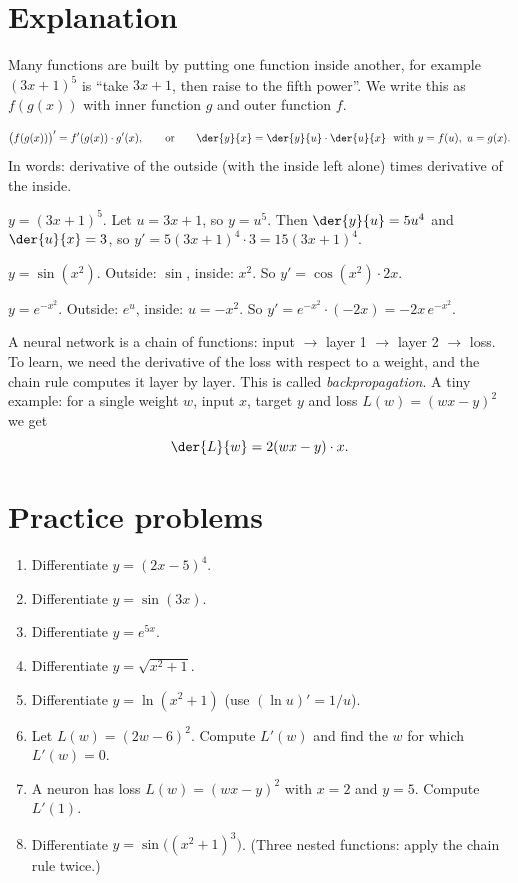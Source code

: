 \label{ch:chain}

\section*{Explanation}
Many functions are built by putting one function inside another, for example $(3x+1)^5$ is ``take $3x+1$, then raise to the fifth power''. We write this as $f(g(x))$ with inner function $g$ and outer function $f$.

\begin{keyidea}
\[
\bigl(f(g(x))\bigr)'=f'(g(x))\cdot g'(x),
\qquad\text{or}\qquad
\der{y}{x}=\der{y}{u}\cdot\der{u}{x}\ \ \text{with } y=f(u),\ u=g(x).
\]
In words: derivative of the outside (with the inside left alone) times derivative of the inside.
\end{keyidea}

\begin{example}
$y=(3x+1)^5$. Let $u=3x+1$, so $y=u^5$. Then $\der{y}{u}=5u^4$ and $\der{u}{x}=3$, so $y'=5(3x+1)^4\cdot 3=15(3x+1)^4$.
\end{example}

\begin{example}
$y=\sin(x^2)$. Outside: $\sin$, inside: $x^2$. So $y'=\cos(x^2)\cdot 2x$.
\end{example}

\begin{example}
$y=e^{-x^2}$. Outside: $e^u$, inside: $u=-x^2$. So $y'=e^{-x^2}\cdot(-2x)=-2x\,e^{-x^2}$.
\end{example}

\begin{aibox}
A neural network is a chain of functions: input $\to$ layer 1 $\to$ layer 2 $\to$ loss. To learn, we need the derivative of the loss with respect to a weight, and the chain rule computes it layer by layer. This is called \emph{backpropagation}. A tiny example: for a single weight $w$, input $x$, target $y$ and loss $L(w)=(wx-y)^2$ we get
\[
\der{L}{w}=2(wx-y)\cdot x.
\]
\end{aibox}

\section*{Practice problems}
\begin{enumerate}[label=\textbf{\thechapter.\arabic*}]
  \item Differentiate $y=(2x-5)^4$.
  \item Differentiate $y=\sin(3x)$.
  \item Differentiate $y=e^{5x}$.
  \item Differentiate $y=\sqrt{x^2+1}$.
  \item Differentiate $y=\ln(x^2+1)$ (use $(\ln u)'=1/u$).
  \item Let $L(w)=(2w-6)^2$. Compute $L'(w)$ and find the $w$ for which $L'(w)=0$.
  \item A neuron has loss $L(w)=(wx-y)^2$ with $x=2$ and $y=5$. Compute $L'(1)$.
  \item[\textbf{4.8}$\star$] Differentiate $y=\sin\bigl((x^2+1)^3\bigr)$. (Three nested functions: apply the chain rule twice.)
\end{enumerate}


